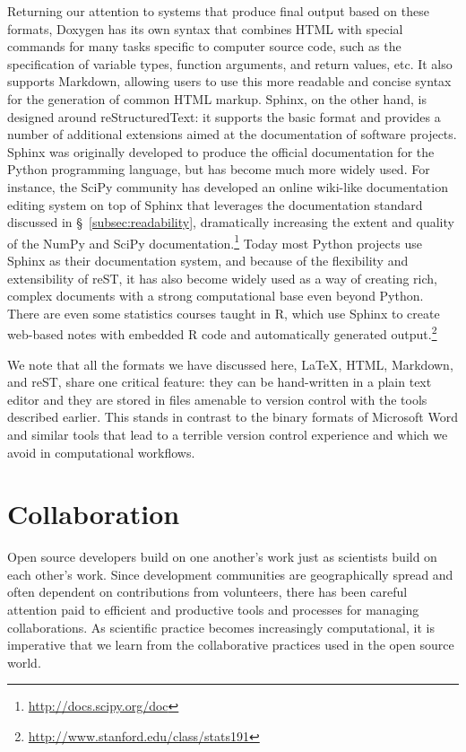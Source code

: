 \documentclass[11pt,oneside,english]{article}
\begin{document}
Returning our attention to systems that produce final output based on these
formats, Doxygen has its own syntax that combines HTML with special commands
for many tasks specific to computer source code, such as the specification of
variable types, function arguments, and return values, etc.  It also supports
Markdown, allowing users to use this more readable and concise syntax for the
generation of common HTML markup.  Sphinx, on the other hand, is designed
around reStructuredText: it supports the basic format and provides a number of
additional extensions aimed at the documentation of software projects. Sphinx
was originally developed to produce the official documentation for the Python
programming language, but has become much more widely used.  For instance, the
SciPy community has developed an online wiki-like documentation editing system
\cite{SciPyProceedings_27} on top of Sphinx that leverages the documentation
standard discussed in §~\ref{subsec:readability}, dramatically increasing the
extent and quality of the NumPy and SciPy
documentation.\footnote{\url{http://docs.scipy.org/doc}}  Today most Python
projects use Sphinx as their documentation system, and because of the
flexibility and extensibility of reST, it has also become widely used as a way
of creating rich, complex documents with a strong computational base even
beyond Python. There are even some statistics courses taught in R, which use
Sphinx to create web-based notes with embedded R code and automatically
generated output.\footnote{\url{http://www.stanford.edu/class/stats191}}

We note that all the formats we have discussed here, \LaTeX{}, HTML, Markdown,
and reST, share one critical feature: they can be hand-written in a plain text
editor and they are stored in files amenable to version control with the tools
described earlier.  This stands in contrast to the binary formats of
Microsoft Word and similar tools that lead to a terrible version control
experience and which we avoid in computational workflows.

\section{\label{sec:collaboration}Collaboration}

Open source developers build on one another's work just as scientists build on
each other's work.  Since development communities are geographically spread and
often dependent on contributions from volunteers, there has been careful
attention paid to efficient and productive tools and processes for managing
collaborations.  As scientific practice becomes increasingly computational, it
is imperative that we learn from the collaborative practices used in the open
source world.
\end{document}
